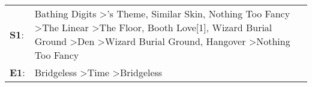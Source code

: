 \begin{supertabular}{p{0.03\textwidth}p{0.92\textwidth}}
 \textbf{S1}:  &  Bathing Digits\textsuperscript{} \textgreater {}'s Theme\textsuperscript{}, \enspace Similar Skin\textsuperscript{}, \enspace Nothing Too Fancy\textsuperscript{} \textgreater \enspace The Linear\textsuperscript{} \textgreater \enspace The Floor\textsuperscript{}, \enspace Booth Love[1]\textsuperscript{}, \enspace Wizard Burial Ground\textsuperscript{} \textgreater \enspace Den\textsuperscript{} \textgreater \enspace Wizard Burial Ground\textsuperscript{}, \enspace Hangover\textsuperscript{} \textgreater \enspace Nothing Too Fancy\textsuperscript{}  \enspace  \\
 \textbf{E1}:  &                                                                                                                                                                                                                                                                                                                                                                                                                                                        Bridgeless\textsuperscript{} \textgreater \enspace Time\textsuperscript{} \textgreater \enspace Bridgeless\textsuperscript{}  \enspace  \\
\end{supertabular}
